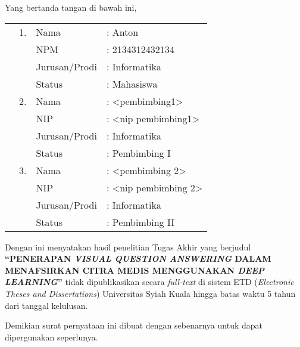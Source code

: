 \spernyataan %

\noindent
Yang bertanda tangan di bawah ini,
\vspace{-0.1cm}
\begin{table}[H]
{\renewcommand{\arraystretch}{0.7}
\begin{tabular}{M{0.6cm}lll}
	&1. 	& Nama   		&: Anton \\
	&	& NPM       			&: 2134312432134   \\
	&	& Jurusan/Prodi   		&: Informatika \\
	&	& Status 				&: Mahasiswa \\  
	&2. 	& Nama  		&: <pembimbing1> \\
	&	& NIP       			&: <nip pembimbing1>   \\
	&	& Jurusan/Prodi   		&: Informatika \\
	&	& Status 				&: Pembimbing I \\  
	&3. 	& Nama  		&: <pembimbing 2> \\
	&	& NIP       			&: <nip pembimbing 2>   \\
	&	& Jurusan/Prodi   		&: Informatika \\
	&	& Status 				&: Pembimbing II   
\end{tabular}
}
\end{table}
\vspace{-0.4cm}
\noindent
Dengan ini menyatakan hasil penelitian Tugas Akhir yang berjudul \textbf{“PENERAPAN \textit{VISUAL QUESTION ANSWERING} DALAM MENAFSIRKAN CITRA MEDIS MENGGUNAKAN \textit{DEEP LEARNING}”} tidak dipublikasikan secara \textit{full-text} di sistem ETD (\textit{Electronic Theses and Dissertations}) Universitas Syiah Kuala hingga batas waktu 5 tahun dari tanggal kelulusan.

\vspace{0.4cm}
\noindent
Demikian surat pernyataan ini dibuat dengan sebenarnya untuk dapat dipergunakan seperlunya.

